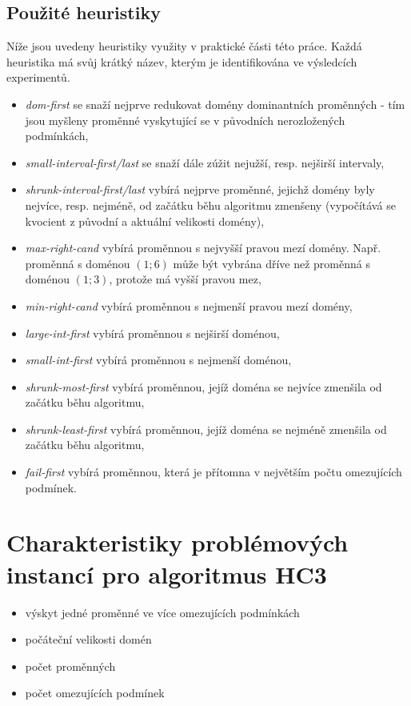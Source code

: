 \subsection{Použité heuristiky}
Níže jsou uvedeny heuristiky využity v praktické části této práce. Každá heuristika má svůj krátký název, kterým je identifikována ve výsledcích experimentů.

\begin{itemize}
  \item \emph{dom-first} se snaží nejprve redukovat domény dominantních proměnných - tím jsou myšleny proměnné vyskytující se v původních nerozložených podmínkách,
  \item \emph{small-interval-first/last} se snaží dále zúžit nejužší, resp. nejširší intervaly,
  \item \emph{shrunk-interval-first/last} vybírá nejprve proměnné, jejichž domény byly nejvíce, resp. nejméně, od začátku běhu algoritmu zmenšeny (vypočítává se kvocient z původní a aktuální velikosti domény),
  \item \emph{max-right-cand} vybírá proměnnou s nejvyšší pravou mezí domény. Např. proměnná s doménou $(1;6)$ může být vybrána dříve než proměnná s doménou $(1;3)$, protože má vyšší pravou mez,
  \item \emph{min-right-cand} vybírá proměnnou s nejmenší pravou mezí domény,
  \item \emph{large-int-first} vybírá proměnnou s nejširší doménou,
  \item \emph{small-int-first} vybírá proměnnou s nejmenší doménou,
  \item \emph{shrunk-most-first} vybírá proměnnou, jejíž doména se nejvíce zmenšila od začátku běhu algoritmu,
  \item \emph{shrunk-least-first} vybírá proměnnou, jejíž doména se nejméně zmenšila od začátku běhu algoritmu,
  \item \emph{fail-first} vybírá proměnnou, která je přítomna v největším počtu omezujících podmínek.
\end{itemize}


\section{Charakteristiky problémových instancí pro algoritmus HC3}
\begin{itemize}
  \item výskyt jedné proměnné ve více omezujících podmínkách
  \item počáteční velikosti domén
  \item počet proměnných
  \item počet omezujících podmínek
\end{itemize}




